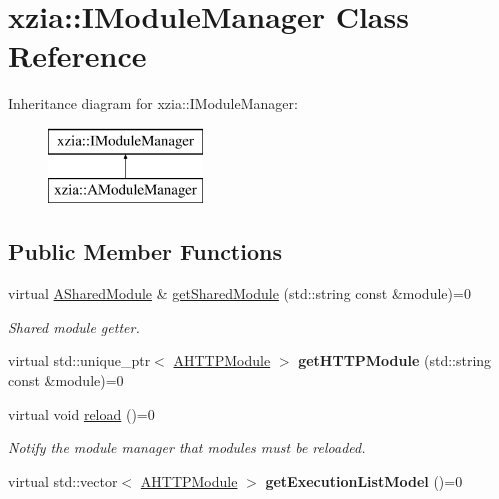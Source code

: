\hypertarget{classxzia_1_1IModuleManager}{}\section{xzia\+:\+:I\+Module\+Manager Class Reference}
\label{classxzia_1_1IModuleManager}
Inheritance diagram for xzia\+:\+:I\+Module\+Manager\+:\begin{figure}[H]
\begin{center}
\leavevmode
\includegraphics[height=2.000000cm]{classxzia_1_1IModuleManager}
\end{center}
\end{figure}
\subsection*{Public Member Functions}
\begin{DoxyCompactItemize}
\item 
virtual \mbox{\hyperlink{classxzia_1_1ASharedModule}{A\+Shared\+Module}} \& \mbox{\hyperlink{classxzia_1_1IModuleManager_a56addcdec0c0b32595807672705b414b}{get\+Shared\+Module}} (std\+::string const \&module)=0
\begin{DoxyCompactList}\small\item\em Shared module getter. \end{DoxyCompactList}\item 
\mbox{\label{classxzia_1_1IModuleManager_aa255ae4721e3575c3e0a83c2bcc1549b}} 
virtual std\+::unique\+\_\+ptr$<$ \mbox{\hyperlink{classxzia_1_1AHTTPModule}{A\+H\+T\+T\+P\+Module}} $>$ {\bfseries get\+H\+T\+T\+P\+Module} (std\+::string const \&module)=0
\item 
\mbox{\label{classxzia_1_1IModuleManager_a0edf1a81440b0f76ef6b6f66cc046fe1}} 
virtual void \mbox{\hyperlink{classxzia_1_1IModuleManager_a0edf1a81440b0f76ef6b6f66cc046fe1}{reload}} ()=0
\begin{DoxyCompactList}\small\item\em Notify the module manager that modules must be reloaded. \end{DoxyCompactList}\item 
\mbox{\label{classxzia_1_1IModuleManager_a8416910511a3434b6a140b45dd1bab13}} 
virtual std\+::vector$<$ \mbox{\hyperlink{classxzia_1_1AHTTPModule}{A\+H\+T\+T\+P\+Module}} $>$ {\bfseries get\+Execution\+List\+Model} ()=0
\end{DoxyCompactItemize}


